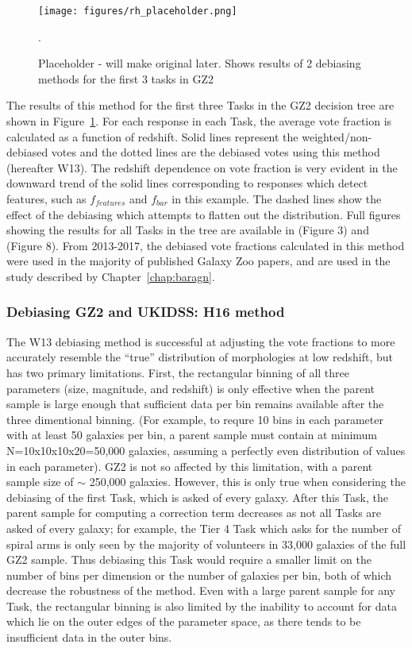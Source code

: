 \begin{figure}
\centering
\texttt{[image: figures/rh\_placeholder.png]}
\caption{Placeholder - will make original later. Shows results of 2 debiasing methods for the first 3 tasks in GZ2}. 
\label{fig:gz2debiasingresults}
\end{figure}

The results of this method for the first three Tasks in the GZ2 decision tree are shown in Figure~\ref{fig:gz2debiasingresults}. For each response in each Task, the average vote fraction is calculated as a function of redshift. Solid lines represent the weighted/non-debiased votes and the dotted lines are the debiased votes using this method (hereafter W13).
The redshift dependence on vote fraction is very evident in the downward trend of the solid lines corresponding to responses which detect features, such as $f_{features}$ and $f_{bar}$ in this example. The dashed lines show the effect of the debiasing which attempts to flatten out the distribution. Full figures showing the results for all Tasks in the tree are available in \citet{Willett2013} (Figure 3) and \citet{Hart2016} (Figure 8). From 2013-2017, the debiased vote fractions calculated in this method were used in the majority of published Galaxy Zoo papers, and are used in the study described by Chapter~\ref{chap:baragn}. 


\subsubsection{Debiasing GZ2 and UKIDSS: H16 method}

The W13 debiasing method is successful at adjusting the vote fractions to more accurately resemble the ``true'' distribution of morphologies at low redshift, but has two primary limitations. First, the rectangular binning of all three parameters (size, magnitude, and redshift) is only effective when the parent sample is large enough that sufficient data per bin remains available after the three dimentional binning. (For example, to requre 10 bins in each parameter with at least 50 galaxies per bin, a parent sample must contain at minimum N=10x10x10x20=50,000 galaxies, assuming a perfectly even distribution of values in each parameter). GZ2 is not so affected by this limitation, with a parent sample size of $\sim$ 250,000 galaxies. However, this is only true when considering the debiasing of the first Task, which is asked of every galaxy. After this Task, the parent sample for computing a correction term decreases as not all Tasks are asked of every galaxy; for example, the Tier 4 Task which asks for the number of spiral arms is only seen by the majority of volunteers in 33,000 galaxies of the full GZ2 sample. Thus debiasing this Task would require a smaller limit on the number of bins per dimension or the number of galaxies per bin, both of which decrease the robustness of the method. Even with a large parent sample for any Task, the rectangular binning is also limited by the inability to account for data which lie on the outer edges of the parameter space, as there tends to be insufficient data in the outer bins. 

